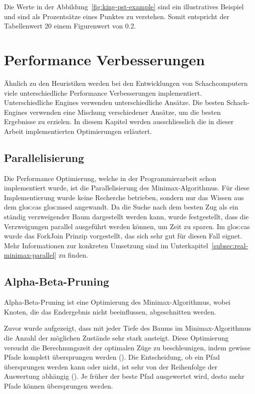 Die Werte in der Abbildung~\ref{fig:king-pst-example} sind ein illustratives Beispiel und sind als Prozentsätze eines Punktes zu verstehen.
Somit entspricht der Tabellenwert 20 einem Figurenwert von 0.2.


\section{Performance Verbesserungen}
Ähnlich zu den Heuristiken werden bei den Entwicklungen von Schachcomputern viele unterschiedliche Performance Verbesserungen implementiert.
Unterschiedliche Engines verwenden unterschiedliche Ansätze.
Die besten Schach-Engines verwenden eine Mischung verschiedener Ansätze, um die besten Ergebnisse zu erzielen.
In diesem Kapitel werden ausschliesslich die in dieser Arbeit implementierten Optimierungen erläutert.

\subsection{Parallelisierung}
Die Performance Optimierung, welche in der Programmierarbeit schon implementiert wurde, ist die Parallelisierung des Minimax-Algorithmus.
Für diese Implementierung wurde keine Recherche betrieben, sondern nur das Wissen aus dem \gls{glos:cas} \gls{glos:msed} angewandt.
Da die Suche nach dem besten Zug als ein ständig verzweigender Baum dargestellt werden kann, wurde festgestellt, dass die Verzweigungen parallel ausgeführt werden können, um Zeit zu sparen.
Im \gls{glos:cas} wurde das ForkJoin Prinzip vorgestellt, das sich sehr gut für diesen Fall eignet.
Mehr Informationen zur konkreten Umsetzung sind im Unterkapitel~\ref{subsec:real-minimax-parallel} zu finden.

\newpage

\subsection{Alpha-Beta-Pruning}
Alpha-Beta-Pruning ist eine Optimierung des Minimax-Algorithmus, wobei Knoten, die das Endergebnis nicht beeinflussen, abgeschnitten werden.

Zuvor wurde aufgezeigt, dass mit jeder Tiefe des Baums im Minimax-Algorithmus die Anzahl der möglichen Zustände sehr stark ansteigt.
Diese Optimierung versucht die Berechnungszeit der optimalen Züge zu beschleunigen, indem gewisse Pfade komplett übersprungen werden (\cite{alphabetagreatlearning}).
Die Entscheidung, ob ein Pfad übersprungen werden kann oder nicht, ist sehr von der Reihenfolge der Auswertung abhängig (\cite{moveordering}).
Je früher der beste Pfad ausgewertet wird, desto mehr Pfade können übersprungen werden.

